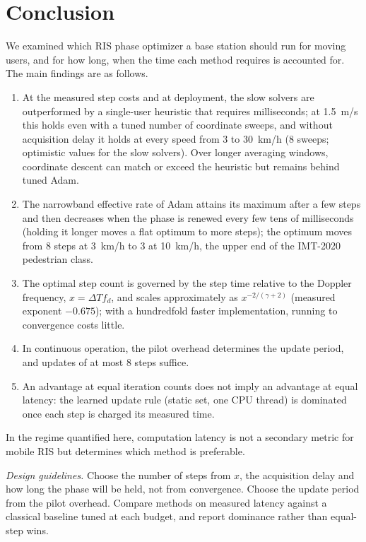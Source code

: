 \section{Conclusion}
\label{sec:conclusion}

We examined which RIS phase optimizer a base station should run for moving users, and for how long, when the time each method requires is accounted for. The main findings are as follows.
\begin{enumerate}
    \item At the measured step costs and at deployment, the slow solvers are outperformed by a single-user heuristic that requires milliseconds; at 1.5~m/s this holds even with a tuned number of coordinate sweeps, and without acquisition delay it holds at every speed from 3 to 30~km/h (8 sweeps; optimistic values for the slow solvers). Over longer averaging windows, coordinate descent can match or exceed the heuristic but remains behind tuned Adam.
    \item The narrowband effective rate of Adam attains its maximum after a few steps and then decreases when the phase is renewed every few tens of milliseconds (holding it longer moves a flat optimum to more steps); the optimum moves from 8 steps at 3~km/h to 3 at 10~km/h, the upper end of the IMT-2020 pedestrian class.
    \item The optimal step count is governed by the step time relative to the Doppler frequency, $x=\Delta T f_d$, and scales approximately as $x^{-2/(\gamma+2)}$ (measured exponent $-0.675$); with a hundredfold faster implementation, running to convergence costs little.
    \item In continuous operation, the pilot overhead determines the update period, and updates of at most 8 steps suffice.
    \item An advantage at equal iteration counts does not imply an advantage at equal latency: the learned update rule (static set, one CPU thread) is dominated once each step is charged its measured time.
\end{enumerate}
In the regime quantified here, computation latency is not a secondary metric for mobile RIS but determines which method is preferable.

\emph{Design guidelines.} Choose the number of steps from $x$, the acquisition delay and how long the phase will be held, not from convergence. Choose the update period from the pilot overhead. Compare methods on measured latency against a classical baseline tuned at each budget, and report dominance rather than equal-step wins.

